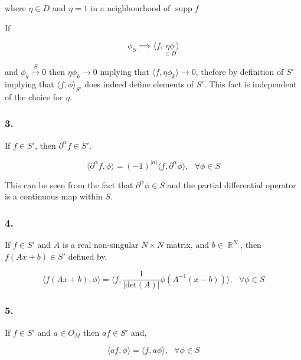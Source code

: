\documentclass[12pt, a4]{article}
\DeclareMathOperator\supp{supp}
\DeclareMathOperator\reals{\mathbb{R}}
\begin{document}
where $\eta \in D$ and $\eta = 1$ in a neighbourhood of $\supp f$

If

\begin{equation}
    \phi_S \implies \langle f, \underset{\in D}{\eta \phi} \rangle
\end{equation}

and $\phi_k \overset{S}{\rightarrow} 0$ then $\eta \phi_k \rightarrow 0$ implying that $\langle f, \eta \phi_k \rangle \rightarrow 0$, thefore by definition of $S'$ implying that $\langle f, \phi \rangle_{S'}$ does indeed define elements of $S'$. This fact is independent of the choice for $\eta$.

\subsubsection*{3.}

If $f \in S'$, then $\partial^\alpha f \in S'$,

\begin{equation}
    \langle \partial^\alpha f, \phi \rangle = (-1)^{|\alpha|} \langle f, \partial^\alpha \phi \rangle, \> \> \> \forall \phi \in S
\end{equation}

This can be seen from the fact that $\partial^\alpha \phi \in S$ and the partial differential operator is a continuous map within $S$.

\subsubsection*{4.}

If $f \in S'$ and $A$ is a real non-singular $N \times N$ matrix, and $b \in \reals^N$, then $f(Ax+b) \in S'$ defined by,

\begin{equation}
    \langle f(Ax+b), \phi \rangle = \langle f, \frac{1}{|\text{det}(A)|}\phi(A^{-1}(x-b))\rangle, \> \> \> \forall \phi \in S
\end{equation}


\subsubsection*{5.}

If $f \in S'$ and $a \in O_M$ then $af \in S'$ and,

\begin{equation}
    \langle af, \phi \rangle = \langle f, a\phi \rangle, \> \> \> \forall \phi \in S
\end{equation}
\end{document}
